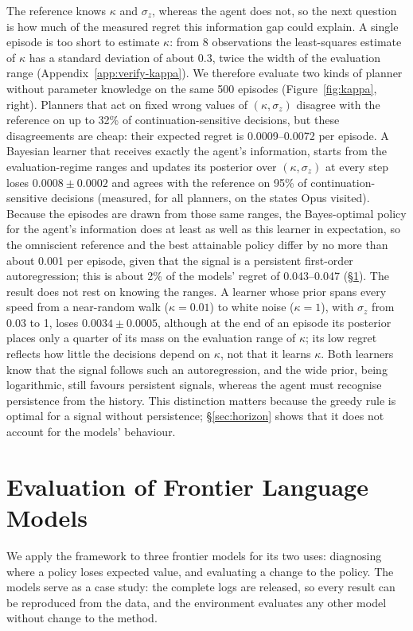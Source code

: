 \documentclass[10pt,a4paper,twocolumn]{article}
\newcommand{\sigz}{\sigma_z}
\begin{document}
The reference knows $\kappa$ and $\sigz$, whereas the agent does not, so the next question is how much of the measured regret this information gap could explain. A single episode is too short to estimate $\kappa$: from 8 observations the least-squares estimate of $\kappa$ has a standard deviation of about 0.3, twice the width of the evaluation range (Appendix~\ref{app:verify-kappa}). We therefore evaluate two kinds of planner without parameter knowledge on the same 500 episodes (Figure~\ref{fig:kappa}, right). Planners that act on fixed wrong values of $(\kappa,\sigz)$ disagree with the reference on up to 32\% of continuation-sensitive decisions, but these disagreements are cheap: their expected regret is 0.0009--0.0072 per episode. A Bayesian learner that receives exactly the agent's information, starts from the evaluation-regime ranges and updates its posterior over $(\kappa,\sigz)$ at every step loses $0.0008\pm0.0002$ and agrees with the reference on 95\% of continuation-sensitive decisions (measured, for all planners, on the states Opus visited). Because the episodes are drawn from those same ranges, the Bayes-optimal policy for the agent's information does at least as well as this learner in expectation, so the omniscient reference and the best attainable policy differ by no more than about 0.001 per episode, given that the signal is a persistent first-order autoregression; this is about 2\% of the models' regret of 0.043--0.047 (\S\ref{sec:eval}). The result does not rest on knowing the ranges. A learner whose prior spans every speed from a near-random walk ($\kappa{=}0.01$) to white noise ($\kappa{=}1$), with $\sigz$ from 0.03 to 1, loses $0.0034\pm0.0005$, although at the end of an episode its posterior places only a quarter of its mass on the evaluation range of $\kappa$; its low regret reflects how little the decisions depend on $\kappa$, not that it learns $\kappa$. Both learners know that the signal follows such an autoregression, and the wide prior, being logarithmic, still favours persistent signals, whereas the agent must recognise persistence from the history. This distinction matters because the greedy rule is optimal for a signal without persistence; \S\ref{sec:horizon} shows that it does not account for the models' behaviour.

\section{Evaluation of Frontier Language Models}\label{sec:eval}

We apply the framework to three frontier models for its two uses: diagnosing where a policy loses expected value, and evaluating a change to the policy. The models serve as a case study: the complete logs are released, so every result can be reproduced from the data, and the environment evaluates any other model without change to the method.
\end{document}
